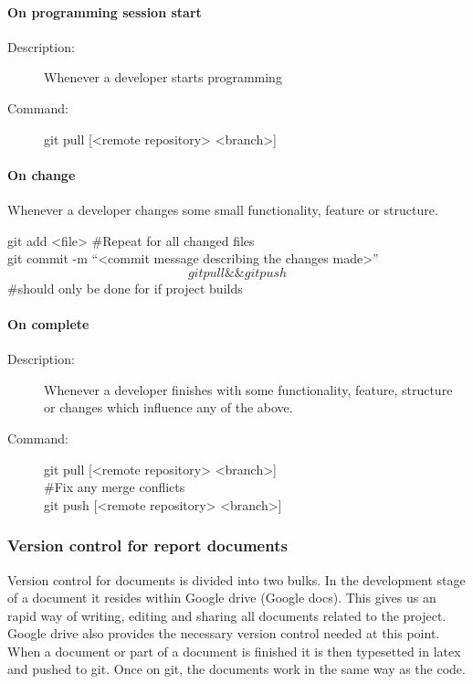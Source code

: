 \paragraph{On programming session start}
\begin{description}
\item[Description:] Whenever a developer starts programming
\item[Command:] git pull [<remote repository> <branch>]
\end{description}

\paragraph{On change}
\begin{description}[style=multiline]
\item[Description:] Whenever a developer changes some small functionality, feature or structure.
\item[Command:] git add <file> \#Repeat for all changed files \\ git commit -m “<commit message describing the changes made>” \\  \[git pull \&\& git push\] \#should only be done for if project builds
\end{description}

\paragraph{On complete}
\begin{description}
\item[Description:]  Whenever a developer finishes with some functionality, feature,  structure or changes which influence 				any of the above.
\item[Command:]  git pull [<remote repository> <branch>] \\  \#Fix any merge conflicts \\ git push [<remote repository> <branch>]
\end{description}

\subsubsection{Version control for report documents}
Version control for documents is divided into two bulks. In the development stage of a document it resides within Google drive (Google docs). This gives us an rapid way of writing, editing and sharing all documents related to the project. Google drive also provides the necessary version control needed at this point. When a document or part of a document is finished it is then typesetted in latex and pushed to git. Once on git, the documents work in the same way as the code.  


